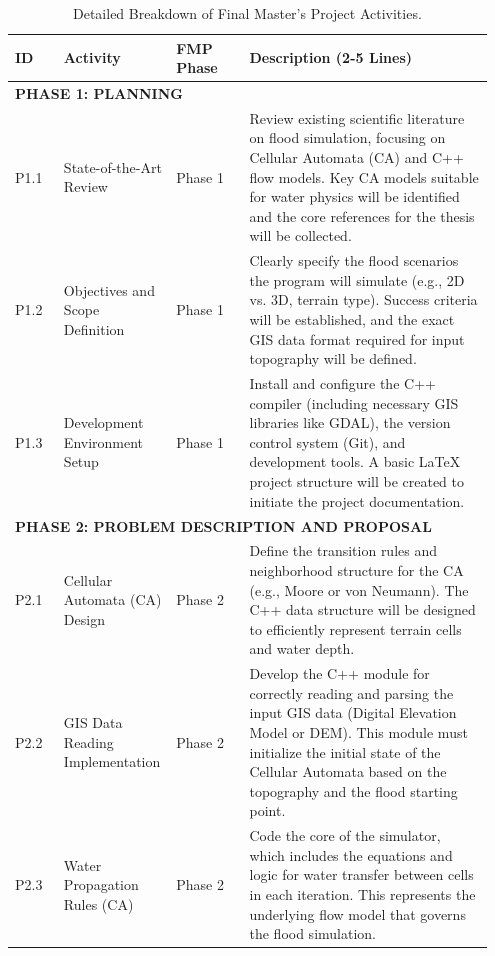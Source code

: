 \begin{longtable}{p{0.1\linewidth} p{0.2\linewidth} p{0.15\linewidth} p{0.5\linewidth}}
    \caption{Detailed Breakdown of Final Master's Project Activities.} \\
    \toprule
    \textbf{ID} & \textbf{Activity} & \textbf{FMP Phase} & \textbf{Description (2-5 Lines)} \\
    \midrule
    \endhead

    \multicolumn{4}{l}{\textbf{PHASE 1: PLANNING}} \\
    \midrule
    P1.1 & State-of-the-Art Review & Phase 1 & Review existing scientific literature on flood simulation, focusing on Cellular Automata (CA) and C++ flow models. Key CA models suitable for water physics will be identified and the core references for the thesis will be collected. \\
    P1.2 & Objectives and Scope Definition & Phase 1 & Clearly specify the flood scenarios the program will simulate (e.g., 2D vs. 3D, terrain type). Success criteria will be established, and the exact GIS data format required for input topography will be defined. \\
    P1.3 & Development Environment Setup & Phase 1 & Install and configure the C++ compiler (including necessary GIS libraries like GDAL), the version control system (Git), and development tools. A basic LaTeX project structure will be created to initiate the project documentation. \\
    \midrule

    \multicolumn{4}{l}{\textbf{PHASE 2: PROBLEM DESCRIPTION AND PROPOSAL}} \\
    \midrule
    P2.1 & Cellular Automata (CA) Design & Phase 2 & Define the transition rules and neighborhood structure for the CA (e.g., Moore or von Neumann). The C++ data structure will be designed to efficiently represent terrain cells and water depth. \\
    P2.2 & GIS Data Reading Implementation & Phase 2 & Develop the C++ module for correctly reading and parsing the input GIS data (Digital Elevation Model or DEM). This module must initialize the initial state of the Cellular Automata based on the topography and the flood starting point. \\
    P2.3 & Water Propagation Rules (CA) & Phase 2 & Code the core of the simulator, which includes the equations and logic for water transfer between cells in each iteration. This represents the underlying flow model that governs the flood simulation. \\
    \midrule


\end{longtable}
